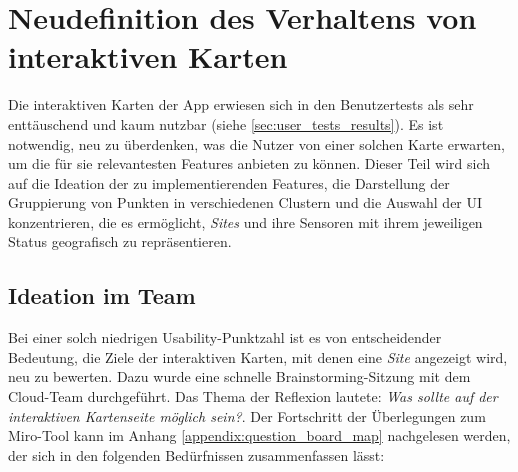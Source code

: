 \section{Neudefinition des Verhaltens von interaktiven Karten} \label{sec:analyse-karten}

Die interaktiven Karten der App erwiesen sich in den Benutzertests als sehr enttäuschend und kaum nutzbar (siehe \ref{sec:user_tests_results}).
Es ist notwendig, neu zu überdenken, was die Nutzer von einer solchen Karte erwarten, um die für sie relevantesten Features anbieten zu können.
Dieser Teil wird sich auf die Ideation der zu implementierenden Features, die Darstellung der Gruppierung von Punkten in verschiedenen Clustern und die Auswahl der UI konzentrieren, die es ermöglicht, \textit{Sites} und ihre Sensoren mit ihrem jeweiligen Status geografisch zu repräsentieren.

\subsection{Ideation im Team}

Bei einer solch niedrigen Usability-Punktzahl ist es von entscheidender Bedeutung, die Ziele der interaktiven Karten, mit denen eine \textit{Site} angezeigt wird, neu zu bewerten.
Dazu wurde eine schnelle Brainstorming-Sitzung mit dem Cloud-Team durchgeführt.
Das Thema der Reflexion lautete: \textit{Was sollte auf der interaktiven Kartenseite möglich sein?}.
Der Fortschritt der Überlegungen zum Miro-Tool kann im Anhang \ref{appendix:question_board_map} nachgelesen werden, der sich in den folgenden Bedürfnissen zusammenfassen lässt:

